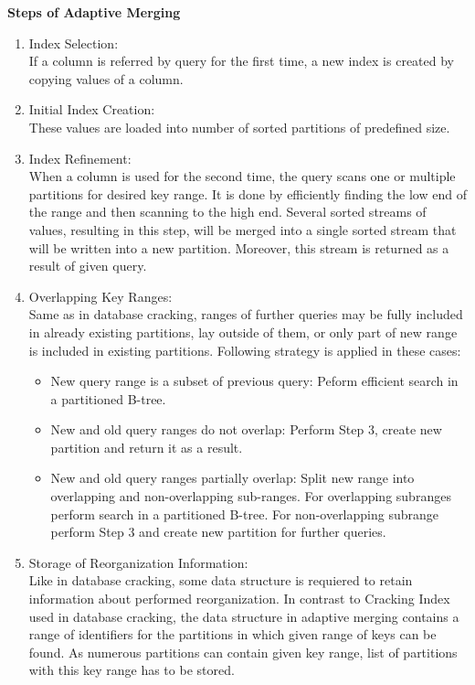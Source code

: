 \documentclass[10pt, conference, compsocconf]{IEEEtran}
\begin{document}
\textbf{Steps of Adaptive Merging} 
\begin{enumerate}
\item{Index Selection:}\\
If a column is referred by query for the first time, a new index is created by copying values of a column. \\
\item{Initial Index Creation:}\\
These values are loaded into number of sorted partitions of predefined size. \\
\item{Index Refinement:}\\
When a column is used for the second time, the query scans one or multiple partitions for desired key range. It is done by efficiently finding the low end of the range and then scanning to the high end. Several sorted streams of values, resulting in this step, will be merged into a single sorted stream that will be written into a new partition. Moreover, this stream is returned as a result of given query.\\
\item{Overlapping Key Ranges:}\\
Same as in database cracking, ranges of further queries may be fully included in already existing partitions, lay outside of them, or only part of new range is included in existing partitions. Following strategy is applied in these cases:
\begin{itemize}
\item{New query range is a subset of previous query: }
Peform efficient search in a partitioned B-tree.\\
\item{New and old query ranges do not overlap: }
Perform Step 3, create new partition and return it as a result.\\
\item{New and old query ranges partially overlap: }
Split new range into overlapping and non-overlapping sub-ranges. For overlapping subranges perform search in a partitioned B-tree. For non-overlapping subrange perform Step 3 and create new partition for further queries.\\
\end{itemize}
\item{Storage of Reorganization Information:}\\
Like in database cracking, some data structure is requiered to retain information about performed reorganization. In contrast to Cracking Index used in database cracking, the data structure in adaptive merging contains a range of identifiers for the partitions in which given range of keys can be found. As numerous partitions can contain given key range, list of partitions with this key range has to be stored.
\end{enumerate}
\end{document}
